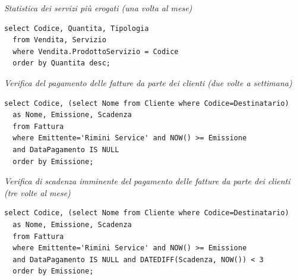 \noindent{}
\newline\newline

\noindent\textit{Statistica dei servizi più erogati (una volta al mese)}
\begin{verbatim}
select Codice, Quantita, Tipologia
  from Vendita, Servizio
  where Vendita.ProdottoServizio = Codice
  order by Quantita desc;
\end{verbatim}
%

\noindent\textit{Verifica del pagamento delle fatture da parte dei clienti (due volte a settimana)}
\begin{verbatim}
select Codice, (select Nome from Cliente where Codice=Destinatario)
  as Nome, Emissione, Scadenza
  from Fattura
  where Emittente='Rimini Service' and NOW() >= Emissione
  and DataPagamento IS NULL
  order by Emissione;
\end{verbatim}
\vspace{0.5cm}

\noindent{}
\newline\newline

\noindent\textit{Verifica di scadenza imminente del pagamento delle fatture da parte dei clienti (tre volte al mese)}
\begin{verbatim}
select Codice, (select Nome from Cliente where Codice=Destinatario)
  as Nome, Emissione, Scadenza
  from Fattura
  where Emittente='Rimini Service' and NOW() >= Emissione
  and DataPagamento IS NULL and DATEDIFF(Scadenza, NOW()) < 3
  order by Emissione;
\end{verbatim}
\vspace{0.5cm}

